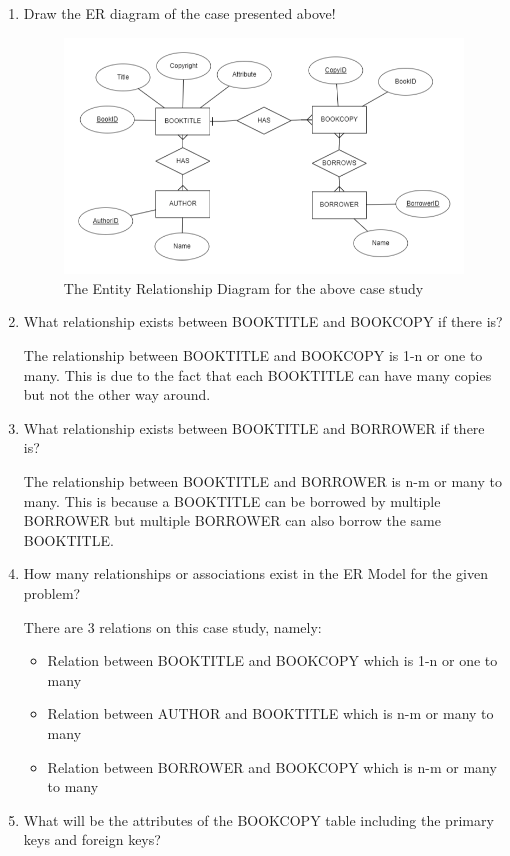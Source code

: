 \documentclass[12pt,titlepage]{article}
\begin{document}
\begin{enumerate}[label=\Alph*.]
    \item {
        Draw the ER diagram of the case presented above!

        \begin{figure}[h]
            \centering
            \includegraphics[width=\textwidth]{./images/erd.png}
            \caption{The Entity Relationship Diagram for the above case study}
        \end{figure}
    }
    \item {
        What relationship exists between BOOKTITLE and BOOKCOPY if there is?

        The relationship between BOOKTITLE and BOOKCOPY is 1-n or one to many.
        This is due to the fact that each BOOKTITLE can have many copies but not the other way around.
    }
    \item {
        What relationship exists between BOOKTITLE and BORROWER if there is?

        The relationship between BOOKTITLE and BORROWER is n-m or many to many.
        This is because a BOOKTITLE can be borrowed by multiple BORROWER but multiple
        BORROWER can also borrow the same BOOKTITLE.
    }
    \item {
        How many relationships or associations exist in the ER Model for the given problem?

        There are 3 relations on this case study, namely:
        \begin{itemize}
            \item Relation between BOOKTITLE and BOOKCOPY which is 1-n or one to many
            \item Relation between AUTHOR and BOOKTITLE which is n-m or many to many
            \item Relation between BORROWER and BOOKCOPY which is n-m or many to many
        \end{itemize}
    }
    \item {
        What will be the attributes of the BOOKCOPY table including the primary keys and foreign keys?

}
\end{enumerate}
\end{document}
